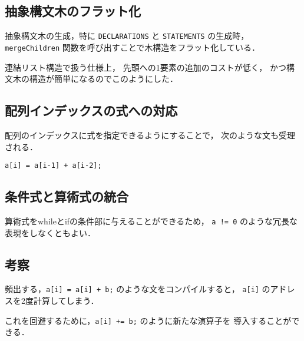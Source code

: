 \documentclass[lualatex, a4paper, ja=standard]{bxjsarticle}
\begin{document}
\subsection{抽象構文木のフラット化}

抽象構文木の生成，特に \verb|DECLARATIONS| と \verb|STATEMENTS| の生成時，
\verb|mergeChildren| 関数を呼び出すことで木構造をフラット化している．

連結リスト構造で扱う仕様上，
先頭への1要素の追加のコストが低く，
かつ構文木の構造が簡単になるのでこのようにした．

\subsection{配列インデックスの式への対応}

配列のインデックスに式を指定できるようにすることで，
次のような文も受理される．
\begin{Verbatim}[frame=lines]
a[i] = a[i-1] + a[i-2];
\end{Verbatim}

\subsection{条件式と算術式の統合}

算術式をwhileとifの条件部に与えることができるため，
\verb|a != 0| のような冗長な表現をしなくともよい．

\subsection{考察}

頻出する，\verb|a[i] = a[i] + b;| のような文をコンパイルすると，
\verb|a[i]| のアドレスを2度計算してしまう．

これを回避するために，\verb|a[i] += b;| のように新たな演算子を
導入することができる．
\end{document}
